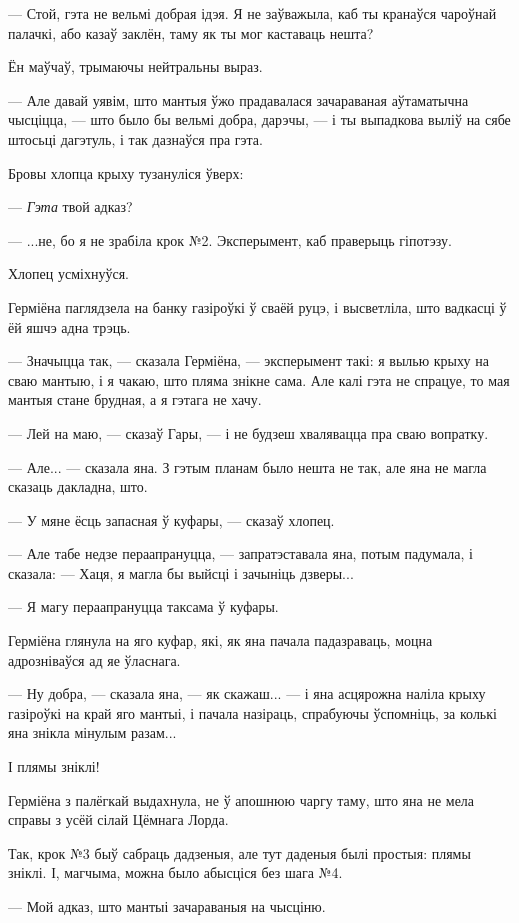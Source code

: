 --- Стой, гэта не вельмі добрая ідэя. Я не заўважыла, каб ты кранаўся
чароўнай палачкі, або казаў заклён, таму як ты мог каставаць нешта?

Ён маўчаў, трымаючы нейтральны выраз.

--- Але давай уявім, што мантыя ўжо прадавалася зачараваная аўтаматычна чысціцца, --- 
што было бы вельмі добра, дарэчы, --- і ты выпадкова выліў на сябе штосьці дагэтуль, і так
дазнаўся пра гэта.

Бровы хлопца крыху тузануліся ўверх:

--- \emph{Гэта}  твой адказ?

--- ...не, бо я не зрабіла крок №2. Эксперымент, каб праверыць гіпотэзу.

Хлопец усміхнуўся.

Герміёна паглядзела на банку газіроўкі ў сваёй руцэ, і высветліла, што вадкасці
ў ёй яшчэ адна трэць.

--- Значыцца так, --- сказала Герміёна, --- эксперымент такі: я вылью крыху на сваю
мантыю, і я чакаю, што пляма знікне сама. Але калі гэта не спрацуе, то мая мантыя 
стане брудная, а я гэтага не хачу.

--- Лей на маю, --- сказаў Гары, --- і не будзеш хвалявацца пра сваю вопратку.

--- Але... --- сказала яна. З гэтым планам было нешта не так, але яна не магла 
сказаць дакладна, што.

--- У мяне ёсць запасная ў куфары, --- сказаў хлопец.

--- Але табе недзе пераапрануцца, --- запратэставала яна, потым падумала, і сказала:
--- Хаця, я магла бы выйсці і зачыніць дзверы...

--- Я магу пераапрануцца таксама ў куфары.

Герміёна глянула на яго куфар, які, як яна пачала падазраваць, моцна адрозніваўся
ад яе ўласнага.

--- Ну добра, --- сказала яна, --- як скажаш... --- і яна асцярожна наліла крыху 
газіроўкі на край яго мантыі, і пачала назіраць, спрабуючы ўспомніць, за колькі 
яна знікла мінулым разам...

І плямы зніклі!

Герміёна з палёгкай выдахнула, не ў апошнюю чаргу таму, што яна не мела справы
з усёй сілай Цёмнага Лорда.

Так, крок №3 быў сабраць дадзеныя, але тут даденыя былі простыя: плямы зніклі.
І, магчыма, можна было абысціся без шага №4. 

--- Мой адказ, што мантыі зачараваныя на чысціню.

